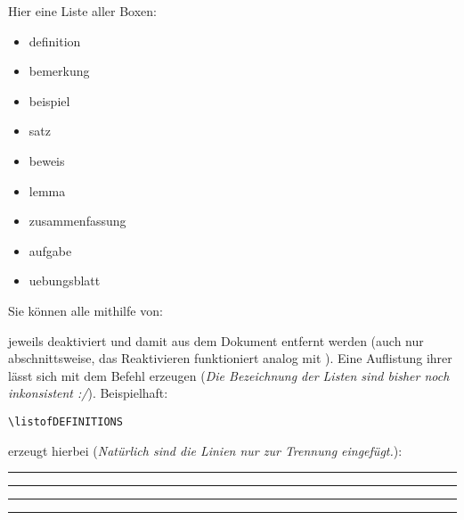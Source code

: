 Hier eine Liste aller Boxen:
\begin{multicols}{3}
    \begin{itemize}[label=$\diamond$]\narrowitems
        \item definition
        \item bemerkung
        \item beispiel
        \item satz
        \item beweis
        \item lemma
        \item zusammenfassung
        \item aufgabe
        \item uebungsblatt
    \end{itemize}
\end{multicols}
Sie können alle mithilfe von:
\begin{latex}
\end{latex}
jeweils deaktiviert und damit aus dem Dokument entfernt werden (auch nur abschnittsweise, das Reaktivieren funktioniert analog mit ). \newline
Eine Auflistung ihrer lässt sich mit dem  Befehl erzeugen (\textit{Die Bezeichnung der Listen sind bisher noch inkonsistent :/}). Beispielhaft:
\begin{lstlisting}[language=lLatex]
\listofDEFINITIONS
\end{lstlisting}
erzeugt hierbei (\textit{Natürlich sind die Linien nur zur Trennung eingefügt.}):\clearpage
{}
\rule{\linewidth}{1.2pt}\vspace{-0.75\baselineskip}
\rule{\linewidth}{0.6pt}\vspace*{-1.5cm}
\listofDEFINITIONS
\rule{\linewidth}{0.6pt}\vspace{-0.7\baselineskip}
\rule{\linewidth}{1.2pt}

\newcommand{\printmark}[2][Linkname]{\ensuremath{\text{#1}^{\rightarrow~\text{\pageref{#2}}}}}





